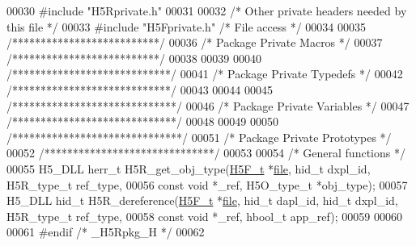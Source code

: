 \begin{DoxyCode}
00030 \textcolor{preprocessor}{#include "H5Rprivate.h"}
00031 
00032 \textcolor{comment}{/* Other private headers needed by this file */}
00033 \textcolor{preprocessor}{#include "H5Fprivate.h"}         \textcolor{comment}{/* File access              */}
00034 
00035 \textcolor{comment}{/**************************/}
00036 \textcolor{comment}{/* Package Private Macros */}
00037 \textcolor{comment}{/**************************/}
00038 
00039 
00040 \textcolor{comment}{/****************************/}
00041 \textcolor{comment}{/* Package Private Typedefs */}
00042 \textcolor{comment}{/****************************/}
00043 
00044 
00045 \textcolor{comment}{/*****************************/}
00046 \textcolor{comment}{/* Package Private Variables */}
00047 \textcolor{comment}{/*****************************/}
00048 
00049 
00050 \textcolor{comment}{/******************************/}
00051 \textcolor{comment}{/* Package Private Prototypes */}
00052 \textcolor{comment}{/******************************/}
00053 
00054 \textcolor{comment}{/* General functions */}
00055 H5\_DLL herr\_t H5R\_get\_obj\_type(\hyperlink{struct_h5_f__t}{H5F\_t} *\hyperlink{structfile}{file}, hid\_t dxpl\_id, H5R\_type\_t ref\_type,
00056     \textcolor{keyword}{const} \textcolor{keywordtype}{void} *\_ref, H5O\_type\_t *obj\_type);
00057 H5\_DLL hid\_t H5R\_dereference(\hyperlink{struct_h5_f__t}{H5F\_t} *\hyperlink{structfile}{file}, hid\_t dapl\_id, hid\_t dxpl\_id, H5R\_type\_t ref\_type,
00058     \textcolor{keyword}{const} \textcolor{keywordtype}{void} *\_ref, hbool\_t app\_ref);
00059 
00060 
00061 \textcolor{preprocessor}{#endif }\textcolor{comment}{/* \_H5Rpkg\_H */}\textcolor{preprocessor}{}
00062 
\end{DoxyCode}
